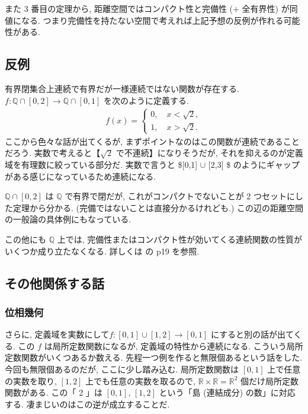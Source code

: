 \documentclass[openany, a4paper, oneside]{book}
\theoremstyle{break}
\theoremstyle{breakdefn}
\begin{document}
また 3 番目の定理から, 距離空間ではコンパクト性と完備性 ($+$ 全有界性) が同値になる.
つまり完備性を持たない空間で考えれば上記予想の反例が作れる可能性がある.
\subsection{反例}
\label{sec-11-3-7-2}

有界閉集合上連続で有界だが一様連続ではない関数が存在する.
$f \colon \mathbb{Q} \cap [0, 2] \to \mathbb{Q} \cap [0, 1]$ を次のように定義する.
\begin{align}
 f (x)
 =
 \begin{cases}
  0, \quad x < \sqrt{2}, \\
  1, \quad x > \sqrt{2}.
 \end{cases}
\end{align}
ここから色々な話が出てくるが, まずポイントなのはこの関数が連続であることだろう.
実数で考えると【$\sqrt{2}$ で不連続】になりそうだが, それを抑えるのが定義域を有理数に絞っている部分だ.
実数で言うと \$[0,1] $\cup$ [2,3] \$ のようにギャップがある感じになっているため連続になる.

$\mathbb{Q} \cap[0, 2]$ は $\mathbb{Q}$ で有界で閉だが,
これがコンパクトでないことが 2 つセットにした定理から分かる.
(完備ではないことは直接分かるけれども.)
この辺の距離空間の一般論の具体例にもなっている.

この他にも $\mathbb{Q}$ 上では, 完備性またはコンパクト性が効いてくる連続関数の性質がいくつか成り立たなくなる.
詳しくは \cite{GelbaumOlmsted1} の p19 を参照.
\subsection{その他関係する話}
\label{sec-11-3-7-3}
\subsubsection{位相幾何}
\label{sec-11-3-7-3-1}

さらに, 定義域を実数にして$f \colon [0,1] \cup [1,2] \to [0,1]$ にすると別の話が出てくる.
この $f$ は局所定数関数になるが, 定義域の特性から連続になる.
こういう局所定数関数がいくつあるか数える.
先程一つ例を作ると無限個あるという話をした.
今回も無限個あるのだが, ここに少し踏み込む.
局所定数関数は $[0,1]$ 上で任意の実数を取り, $[1,2]$ 上でも任意の実数を取るので,
$\mathbb{R} \times \mathbb{R} = \mathbb{R}^2$ 個だけ局所定数関数がある.
この「 2 」は $[0,1]$, $[1,2]$ という「島 (連結成分) の数」に対応する.
凄まじいのはこの逆が成立することだ.
\end{document}
